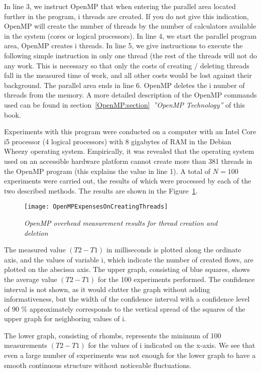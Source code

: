 {	\begin{figure}[H]
		
	\end{figure}
	In line 3, we instruct OpenMP that when entering the parallel area located further in the program, i threads are created. If you do not give this indication, OpenMP will create the number of threads by the number of calculators available in the system (cores or logical processors). In line 4, we start the parallel program area, OpenMP creates i threads. In line 5, we give instructions to execute the following simple instruction in only one thread (the rest of the threads will not do any work. This is necessary so that only the costs of creating / deleting threads fall in the measured time of work, and all other costs would be lost against their background. The parallel area ends in line 6. OpenMP deletes the i number of  threads from the memory. A more detailed description of the OpenMP commands used can be found in section~\ref{OpenMP:section}~\textit{''OpenMP Technology''} of this book.
	\par Experiments with this program were conducted on a computer with an Intel Core i5 processor (4 logical processors) with 8 gigabytes of RAM in the Debian Wheezy operating system. Empirically, it was revealed that the operating system used on an accessible hardware platform cannot create more than 381 threads in the OpenMP program (this explains the value in line 1). A total of $N = 100$ experiments were carried out, the results of which were processed by each of the two described methods. The results are shown in the Figure~\ref{OpenMPExpensesOnCreatingThreads:image}.
	\begin{figure}[H]
		\texttt{[image: OpenMPExpensesOnCreatingThreads]}
		\caption{\textit{OpenMP overhead measurement results for thread creation and deletion}}
		\label{OpenMPExpensesOnCreatingThreads:image}
	\end{figure} 
	\par The measured value $(T2 - T1)$ in milliseconds is plotted along the ordinate axis, and the values of variable i, which indicate the number of created flows, are plotted on the abscissa axis. The upper graph, consisting of blue squares, shows the average value $(T2 - T1)$ for the 100 experiments performed. The confidence interval is not shown, as it would clutter the graph without adding informativeness, but the width of the confidence interval with a confidence level of 90 \% approximately corresponds to the vertical spread of the squares of the upper graph for neighboring values of i.
	\par The lower graph, consisting of rhombs, represents the minimum of 100 measurements $(T2 - T1)$ for the values of i indicated on the x-axis. We see that even a large number of experiments was not enough for the lower graph to have a smooth continuous structure without noticeable fluctuations.

}